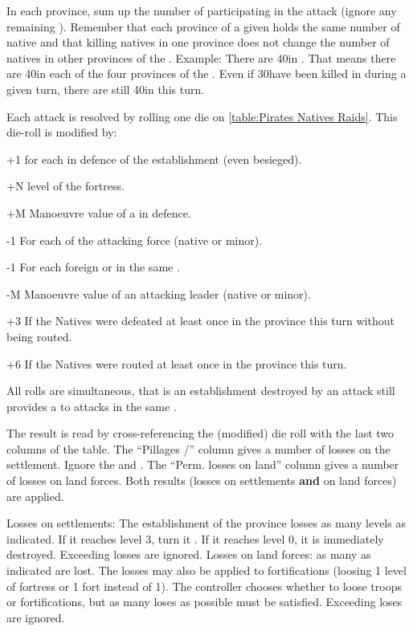 \bparag In each province, sum up the number of \LD participating in the
attack (ignore any remaining \LDE).
\bparag Remember that each province of a given \Area holds the same number of
native \LD and that killing natives in one province does not change the number
of natives in other provinces of the \Area.
\bparag Example: There are 40\LD in \granderegionJapon. That means there are
40\LD in each of the four provinces of the \Area. Even if 30\LD have been
killed in \provinceEdo during a given turn, there are still 40\LD in
\provinceKyoto this turn.

\bparag Each attack is resolved by rolling one 
die on \ref{table:Pirates
  Natives Raids}. This die-roll is modified by:
\begin{modlist}
\item[+1] for each \LD in defence of the establishment (even besieged).
\item[+N] level of the fortress.
\item[+M] Manoeuvre value of a  in defence.
\item[-1] For each \LD of the attacking force (native or \ROTW minor).
\item[-1] For each foreign \COL or \TP in the same \Area.
\item[-M] Manoeuvre value of an attacking leader (native or \ROTW minor).
\item[+3] If the Natives were defeated at least once in the province this turn
  without being routed.
\item[+6]If the Natives were routed at least once in the province this turn.
\end{modlist}
\bparag All rolls are simultaneous, that is an establishment destroyed by an
attack still provides a  to attacks in the same \Area.

\bparag The result is read by cross-referencing the (modified) die roll with
the last two columns of the table.
\bparag The ``Pillages \TP/\COL'' column gives a number of losses on the
settlement. Ignore the \textddag\xspace and \textdag.
\bparag The ``Perm. losses on land'' column gives a number of losses on land
forces.
\bparag Both results (losses on settlements \textbf{and} on land forces) are
applied.

\bparag Losses on settlements: The establishment of the province losses as
many levels as indicated. If it reaches level 3, turn it \Facemoins. If it
reaches level 0, it is immediately destroyed. Exceeding losses are ignored.
\bparag Losses on land forces: as many \LD as indicated are lost. The losses
may also be applied to fortifications (loosing 1 level of fortress or 1 fort
instead of 1\LD). The controller chooses whether to loose troops or
fortifications, but as many loses as possible must be satisfied. Exceeding
loses are ignored.

